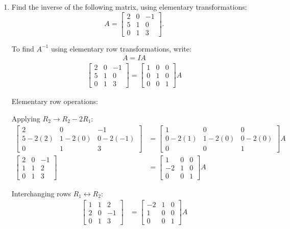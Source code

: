 \begin{enumerate}[label=\thesubsection.\arabic*, ref=\thesubsection.\theenumi]
\item Find the inverse of the following matrix, using elementary transformations:
\[
A=\begin{bmatrix}
2&0&-1\\
5&1&0\\
0&1&3
\end{bmatrix}.
\]

\solution
To find $A^{-1}$ using elementary row transformations, write:
\begin{align*}
	A = I A
\end{align*}
\begin{align*}
	\begin{bmatrix}
		2 & 0 & -1 \\
		5 & 1 & 0 \\
		0 & 1 & 3
	\end{bmatrix}
	=
	\begin{bmatrix}
		1 & 0 & 0 \\
		0 & 1 & 0 \\
		0 & 0 & 1
	\end{bmatrix}
	A
\end{align*}

Elementary row operations:

Applying $R_2 \to R_2 - 2R_1$:
\begin{align*}
	\begin{bmatrix}
		2 & 0 & -1 \\
		5 - 2(2) & 1 - 2(0) & 0 - 2(-1) \\
		0 & 1 & 3
	\end{bmatrix}
	&=
	\begin{bmatrix}
		1 & 0 & 0 \\
		0 - 2(1) & 1 - 2(0) & 0 - 2(0) \\
		0 & 0 & 1
	\end{bmatrix}
	A \\
	\begin{bmatrix}
		2 & 0 & -1 \\
		1 & 1 & 2 \\
		0 & 1 & 3
	\end{bmatrix}
	&=
	\begin{bmatrix}
		1 & 0 & 0 \\
		-2 & 1 & 0 \\
		0 & 0 & 1
	\end{bmatrix}
	A
\end{align*}

Interchanging rows $R_1 \leftrightarrow R_2$:
\begin{align*}
	\begin{bmatrix}
		1 & 1 & 2 \\
		2 & 0 & -1 \\
		0 & 1 & 3
	\end{bmatrix}
	&=
	\begin{bmatrix}
		-2 & 1 & 0 \\
		1 & 0 & 0 \\
		0 & 0 & 1
	\end{bmatrix}
	A
\end{align*}


\end{enumerate}
